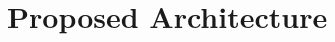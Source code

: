 \documentclass[conference,twocolumn,10pt]{IEEEtran}
\begin{document}







\section{Proposed Architecture}
\end{document}
